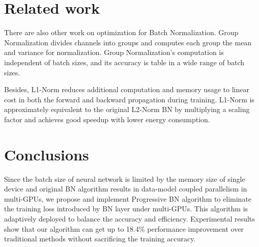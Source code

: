 \documentclass{llncs}
\begin{document}
\section{Related work}



There are also other work on optimization for Batch Normalization. Group Normalization \cite{groupBN} divides channels into groups and computes each group the mean and variance for normalization. Group Normalization's computation is independent of batch sizes, and its accuracy is table in a wide range of batch sizes.

Besides, L1-Norm \cite{L1BN} reduces additional computation and memory usage to linear cost in both the forward and backward propagation during training. L1-Norm is approximately equivalent to the original L2-Norm BN by multiplying a scaling factor and achieves good speedup with lower energy consumption.


\section{Conclusions}

Since the batch size of neural network is limited by the memory size of single device and original BN algorithm results in data-model coupled parallelism in multi-GPUs, we propose and implement Progressive BN algorithm to eliminate the training loss introduced by BN layer under multi-GPUs. This algorithm is adaptively deployed to balance the accuracy and efficiency. Experimental results show that our algorithm can get up to 18.4\% performance improvement over traditional methods without sacrificing the training accuracy. 








\end{document}
